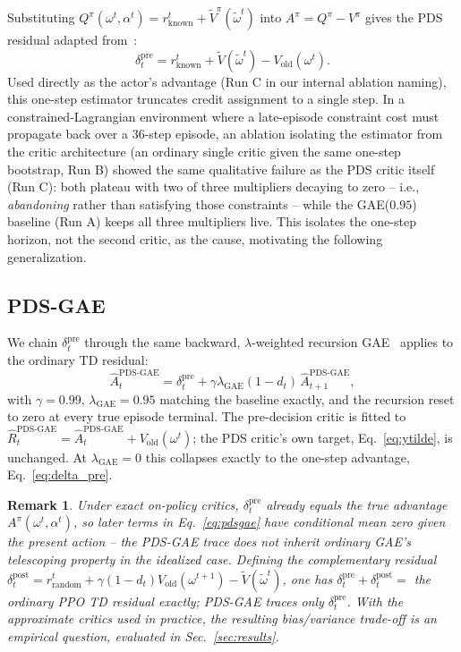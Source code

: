 \documentclass[conference]{IEEEtran}
\newtheorem{remark}{Remark}
\begin{document}
Substituting $Q^\pi(\omega^t,\alpha^t) = r^t_{\text{known}} + \tilde V^\pi(\tilde\omega^t)$
into $A^\pi = Q^\pi - V^\pi$ gives the PDS residual adapted from~\cite{ref_ehs}:
\begin{equation}
\delta_t^{\text{pre}} = r_{\text{known}}^t + \tilde V(\tilde\omega^t) - V_{\text{old}}(\omega^t). \label{eq:delta_pre}
\end{equation}
Used directly as the actor's advantage (Run C in our internal ablation naming), this
one-step estimator truncates credit assignment to a single step. In a
constrained-Lagrangian environment where a late-episode constraint cost must propagate
back over a $36$-step episode, an ablation isolating the estimator from the critic
architecture (an ordinary single critic given the same one-step bootstrap, Run B)
showed the same qualitative failure as the PDS critic itself (Run C): both plateau with
two of three multipliers decaying to zero -- i.e., \emph{abandoning} rather than
satisfying those constraints -- while the GAE($0.95$) baseline (Run A) keeps all three
multipliers live. This isolates the one-step horizon, not the second critic, as the
cause, motivating the following generalization.

\subsection{PDS-GAE}

We chain $\delta_t^{\text{pre}}$ through the same backward,
$\lambda$-weighted recursion GAE~\cite{schulman2016gae} applies to the ordinary TD
residual:
\begin{equation}
\hat A_t^{\text{PDS-GAE}} = \delta_t^{\text{pre}} + \gamma\lambda_{\text{GAE}}(1-d_t)\,\hat A_{t+1}^{\text{PDS-GAE}}, \label{eq:pdsgae}
\end{equation}
with $\gamma{=}0.99$, $\lambda_{\text{GAE}}{=}0.95$ matching the baseline exactly, and
the recursion reset to zero at every true episode terminal. The pre-decision critic is
fitted to $\hat R_t^{\text{PDS-GAE}} = \hat A_t^{\text{PDS-GAE}} + V_{\text{old}}(\omega^t)$;
the PDS critic's own target, Eq.~\eqref{eq:ytilde}, is unchanged. At $\lambda_{\text{GAE}}{=}0$
this collapses exactly to the one-step advantage, Eq.~\eqref{eq:delta_pre}.

\begin{remark}
Under \emph{exact} on-policy critics, $\delta_t^{\text{pre}}$ already equals the true
advantage $A^\pi(\omega^t,\alpha^t)$, so later terms in Eq.~\eqref{eq:pdsgae} have
conditional mean zero given the present action -- the PDS-GAE trace does not inherit
ordinary GAE's telescoping property in the idealized case. Defining the complementary
residual $\delta_t^{\text{post}} = r^t_{\text{random}} + \gamma(1{-}d_t)V_{\text{old}}(\omega^{t+1}) - \tilde V(\tilde\omega^t)$,
one has $\delta_t^{\text{pre}} + \delta_t^{\text{post}} = $ the ordinary PPO TD residual
exactly; PDS-GAE traces only $\delta_t^{\text{pre}}$. With the \emph{approximate}
critics used in practice, the resulting bias/variance trade-off is an empirical
question, evaluated in Sec.~\ref{sec:results}.
\end{remark}
\end{document}

